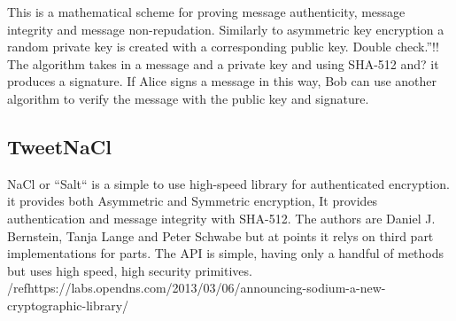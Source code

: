 This is a mathematical scheme for proving message authenticity, message integrity and message non-repudation. Similarly to asymmetric key encryption a random private key is created with a corresponding public key. Double check.''!! The algorithm takes in a message and a private key and using SHA-512 and? it produces a signature. If Alice signs a message in this way, Bob can use another algorithm to verify the message with the public key and signature.

\subsection{TweetNaCl}

NaCl or ``Salt`` is a simple to use high-speed library for authenticated encryption. it provides both Asymmetric and Symmetric encryption, It provides authentication and message integrity with SHA-512. The authors are Daniel J. Bernstein, Tanja Lange and Peter Schwabe but at points it relys on third part implementations for parts. The API is simple, having only a handful of methods but uses high speed, high security primitives.
/ref{https://labs.opendns.com/2013/03/06/announcing-sodium-a-new-cryptographic-library/}

